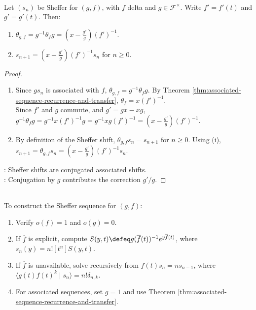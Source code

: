 \begin{corollary} \label{cor:sheffer-shift-formula} \\
Let $(s_n)$ be Sheffer for $(g,f)$, with $f$ delta and $g\in\mathscr{F}^{\times}$. Write $f'=f'(t)$ and $g'=g'(t)$. Then:
\begin{enumerate}[label=(\roman*)]
\setlength{\itemsep}{0pt}
\item $\theta_{g,f}=g^{-1}\theta_fg=\left(x-\frac{g'}{g}\right)(f')^{-1}$.
\item $s_{n+1}=\left(x-\frac{g'}{g}\right)(f')^{-1}s_n$ for $n\geq0$.
\end{enumerate}
\begin{proof}
\begin{enumerate}[label=(\roman*)]
\setlength{\itemsep}{0pt}
\item Since $gs_n$ is associated with $f$, $\theta_{g,f}=g^{-1}\theta_fg$. By Theorem \ref{thm:associated-sequence-recurrence-and-transfer}, $\theta_f=x(f')^{-1}$.\\
Since $f'$ and $g$ commute, and $g'=gx-xg$, $g^{-1}\theta_fg=g^{-1}x(f')^{-1}g=g^{-1}xg(f')^{-1}=\left(x-\frac{g'}{g}\right)(f')^{-1}$.
\item By definition of the Sheffer shift, $\theta_{g,f}s_n=s_{n+1}$ for $n\geq0$. Using (i), $s_{n+1}=\theta_{g,f}s_n=\left(x-\frac{g'}{g}\right)(f')^{-1}s_n$.
\end{enumerate}
: Sheffer shifts are conjugated associated shifts.\\
: Conjugation by $g$ contributes the correction $g'/g$.
\end{proof}
\end{corollary}

\begin{method} \label{meth:building-sheffer-sequences} \\
To construct the Sheffer sequence for $(g,f)$:
\begin{enumerate}[label=(\roman*)]
\setlength{\itemsep}{0pt}
\item Verify $o(f)=1$ and $o(g)=0$.
\item If $\overline f$ is explicit, compute $S(y,t)\defeq g(\overline f(t))^{-1}e^{y\overline f(t)}$, where $s_n(y)=n![t^n]S(y,t)$.
\item If $\overline f$ is unavailable, solve recursively from $f(t)s_n=ns_{n-1}$, where $\langle g(t)f(t)^k\mid s_n\rangle=n!\delta_{n,k}$.
\item For associated sequences, set $g=1$ and use Theorem
\ref{thm:associated-sequence-recurrence-and-transfer}.
\end{enumerate}
\end{method}

